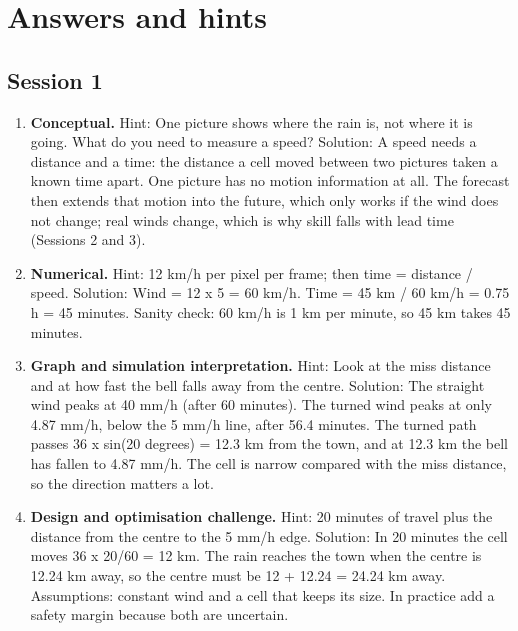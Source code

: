 \documentclass[11pt,a4paper]{article}
\begin{document}
\section{Answers and hints}

\subsection*{Session 1}
\begin{enumerate}[nosep]
\item \textbf{Conceptual.} Hint: One picture shows where the rain is, not where it is going. What do you need to measure a speed? Solution: A speed needs a distance and a time: the distance a cell moved between two pictures taken a known time apart. One picture has no motion information at all. The forecast then extends that motion into the future, which only works if the wind does not change; real winds change, which is why skill falls with lead time (Sessions 2 and 3).
\item \textbf{Numerical.} Hint: 12 km/h per pixel per frame; then time = distance / speed. Solution: Wind = 12 x 5 = 60 km/h. Time = 45 km / 60 km/h = 0.75 h = 45 minutes. Sanity check: 60 km/h is 1 km per minute, so 45 km takes 45 minutes.
\item \textbf{Graph and simulation interpretation.} Hint: Look at the miss distance and at how fast the bell falls away from the centre. Solution: The straight wind peaks at 40 mm/h (after 60 minutes). The turned wind peaks at only 4.87 mm/h, below the 5 mm/h line, after 56.4 minutes. The turned path passes 36 x sin(20 degrees) = 12.3 km from the town, and at 12.3 km the bell has fallen to 4.87 mm/h. The cell is narrow compared with the miss distance, so the direction matters a lot.
\item \textbf{Design and optimisation challenge.} Hint: 20 minutes of travel plus the distance from the centre to the 5 mm/h edge. Solution: In 20 minutes the cell moves 36 x 20/60 = 12 km. The rain reaches the town when the centre is 12.24 km away, so the centre must be 12 + 12.24 = 24.24 km away. Assumptions: constant wind and a cell that keeps its size. In practice add a safety margin because both are uncertain.
\end{enumerate}
\end{document}

